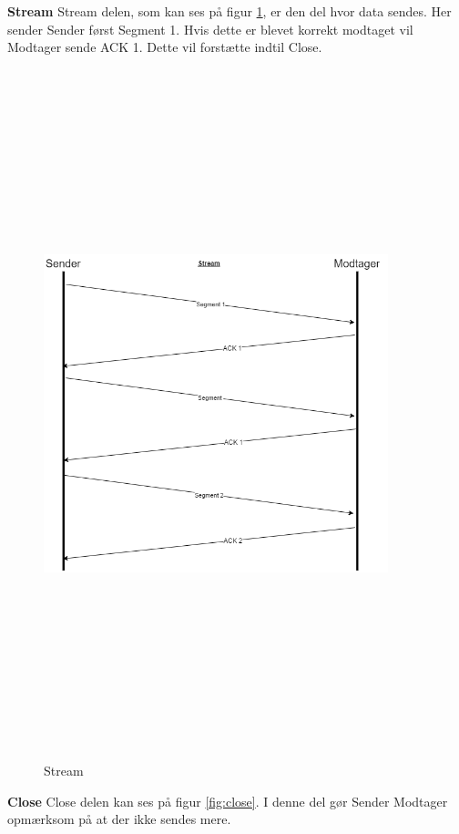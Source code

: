 \hfill \break
\textbf{Stream} %
\newline
Stream delen, som kan ses på figur \ref{fig:stream}, er den del hvor data sendes.
\newline
Her sender Sender først Segment 1. Hvis dette er blevet korrekt modtaget vil Modtager sende ACK 1.
Dette vil forstætte indtil Close. 

\begin{figure}[ht]
	\centering
	\includegraphics[width=10cm,height=20cm,keepaspectratio]{pictures/Stream.png}
	\caption{Stream}
	\label{fig:stream}
\end{figure}
\textbf{Close}
\newline
Close delen kan ses på figur \ref{fig:close}.
\newline
I denne del gør Sender Modtager opmærksom på at der ikke sendes mere.


